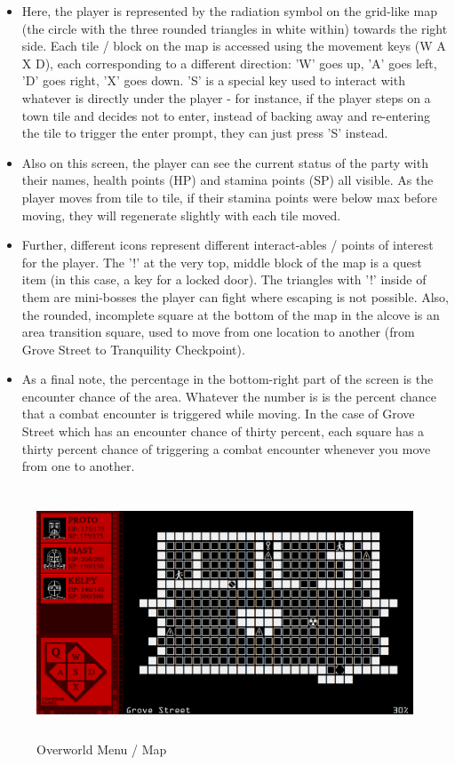 \documentclass[10pt,conference,onecolumn,compsoc]{IEEEtran}
\begin{document}
\begin{itemize}

\item Here, the player is represented by the radiation symbol on the grid-like map (the circle with the three rounded triangles in white within) towards the right side. Each tile / block on the map is accessed using the movement keys (W A X D), each corresponding to a different direction: 'W' goes up, 'A' goes left, 'D' goes right, 'X' goes down. 'S' is a special key used to interact with whatever is directly under the player - for instance, if the player steps on a town tile and decides not to enter, instead of backing away and re-entering the tile to trigger the enter prompt, they can just press 'S' instead.

\item Also on this screen, the player can see the current status of the party with their names, health points (HP) and stamina points (SP) all visible. As the player moves from tile to tile, if their stamina points were below max before moving, they will regenerate slightly with each tile moved.

\item Further, different icons represent different interact-ables / points of interest for the player. The '!' at the very top, middle block of the map is a quest item (in this case, a key for a locked door). The triangles with '!' inside of them are mini-bosses the player can fight where escaping is not possible. Also, the rounded, incomplete square at the bottom of the map in the alcove is an area transition square, used to move from one location to another (from Grove Street to Tranquility Checkpoint).

\item As a final note, the percentage in the bottom-right part of the screen is the encounter chance of the area. Whatever the number is is the percent chance that a combat encounter is triggered while moving. In the case of Grove Street which has an encounter chance of thirty percent, each square has a thirty percent chance of triggering a combat encounter whenever you move from one to another.

\end{itemize}


\begin{figure}[ht!]
\centering
\includegraphics[height=281.25px, width=500px]{Mockups/CYBERNUKE_OVERWORLD_SCREENSHOT.png}
\caption{Overworld Menu / Map}
\label{combat_mockup}
\end{figure}
\end{document}
